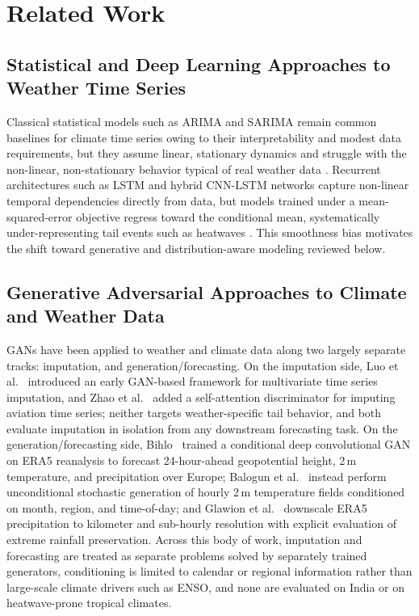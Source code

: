 \documentclass[conference]{IEEEtran}
\begin{document}
\section{Related Work}
\label{sec:related}

\subsection{Statistical and Deep Learning Approaches to Weather Time Series}

Classical statistical models such as ARIMA and SARIMA remain common baselines for climate time series
owing to their interpretability and modest data requirements, but they assume linear, stationary
dynamics and struggle with the non-linear, non-stationary behavior typical of real weather data
\cite{alejosanchez2025missing}. Recurrent architectures such as LSTM and hybrid CNN-LSTM networks
capture non-linear temporal dependencies directly from data, but models trained under a
mean-squared-error objective regress toward the conditional mean, systematically under-representing
tail events such as heatwaves \cite{alejosanchez2025missing}. This smoothness bias motivates the shift
toward generative and distribution-aware modeling reviewed below.

\subsection{Generative Adversarial Approaches to Climate and Weather Data}

GANs have been applied to weather and climate data along two largely separate tracks: imputation, and
generation/forecasting. On the imputation side, Luo et al.~\cite{luo2018multivariate} introduced an
early GAN-based framework for multivariate time series imputation, and Zhao et al.~\cite{zhao2024qar}
added a self-attention discriminator for imputing aviation time series; neither targets
weather-specific tail behavior, and both evaluate imputation in isolation from any downstream
forecasting task. On the generation/forecasting side, Bihlo~\cite{bihlo2021generative} trained a
conditional deep convolutional GAN on ERA5 reanalysis to forecast 24-hour-ahead geopotential height,
2\,m temperature, and precipitation over Europe; Balogun et al.~\cite{balogun2024temperaturegan}
instead perform unconditional stochastic generation of hourly 2\,m temperature fields conditioned on
month, region, and time-of-day; and Glawion et al.~\cite{glawion2025spateganera5} downscale ERA5
precipitation to kilometer and sub-hourly resolution with explicit evaluation of extreme rainfall
preservation. Across this body of work, imputation and forecasting are treated as separate problems
solved by separately trained generators, conditioning is limited to calendar or regional information
rather than large-scale climate drivers such as ENSO, and none are evaluated on India or on
heatwave-prone tropical climates.
\end{document}
